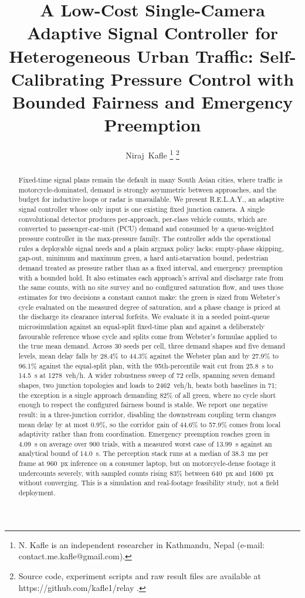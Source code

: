 \documentclass[journal]{IEEEtran}
\title{A Low-Cost Single-Camera Adaptive Signal Controller for Heterogeneous
Urban Traffic: Self-Calibrating Pressure Control with Bounded Fairness and
Emergency Preemption}
\author{Niraj~Kafle%
\thanks{N. Kafle is an independent researcher in Kathmandu, Nepal
(e-mail: contact.me.kafle@gmail.com).}%
\thanks{Source code, experiment scripts and raw result files are available at
https://github.com/kafle1/relay .}}
\date{}
\newcommand{\relay}{R.E.L.A.Y.}
\newcommand{\pcu}{PCU}
\begin{document}
\maketitle

\begin{abstract}
\noindent
Fixed-time signal plans remain the default in many South Asian cities, where traffic is
motorcycle-dominated, demand is strongly asymmetric between approaches, and the budget for inductive
loops or radar is unavailable. We present \relay, an adaptive signal controller whose only input is one
existing fixed junction camera. A single convolutional detector produces per-approach, per-class vehicle
counts, which are converted to passenger-car-unit (\pcu) demand and consumed by a queue-weighted
pressure controller in the max-pressure family. The controller adds the operational rules a deployable
signal needs and a plain argmax policy lacks: empty-phase skipping, gap-out, minimum and maximum green,
a hard anti-starvation bound, pedestrian demand treated as pressure rather than as a fixed interval, and
emergency preemption with a bounded hold. It also estimates each approach's arrival and discharge rate
from the same counts, with no site survey and no configured saturation flow, and uses those estimates for
two decisions a constant cannot make: the green is sized from Webster's cycle evaluated on the measured
degree of saturation, and a phase change is priced at the discharge its clearance interval forfeits.
We evaluate it in a seeded point-queue microsimulation against an equal-split fixed-time plan and against
a deliberately favourable reference whose cycle and splits come from Webster's formulae applied to the
true mean demand. Across 30 seeds per cell, three demand shapes and five demand levels, mean delay falls
by 28.4\% to 44.3\% against the Webster plan and by 27.9\% to 96.1\% against the equal-split plan, with
the 95th-percentile wait cut from 25.8~s to 14.5~s at 1278~veh/h. A wider robustness sweep of 72 cells,
spanning seven demand shapes, two junction topologies and loads to 2462~veh/h, beats both baselines in 71;
the exception is a single approach demanding 82\% of all green, where no cycle short enough to respect the
configured fairness bound is stable. We report one negative result: in a three-junction corridor, disabling
the downstream coupling term changes mean delay by at most 0.9\%, so the corridor gain of 44.6\% to 57.9\%
comes from local adaptivity rather than from coordination. Emergency preemption reaches green in 4.09~s on
average over 900 trials, with a measured worst case of 13.99~s against an analytical bound of 14.0~s. The
perception stack runs at a median of 38.3~ms per frame at 960~px inference on a consumer laptop, but on
motorcycle-dense footage it undercounts severely, with sampled counts rising 83\% between 640~px and
1600~px without converging. This is a simulation and real-footage feasibility study, not a field
deployment.
\end{abstract}
\end{document}
